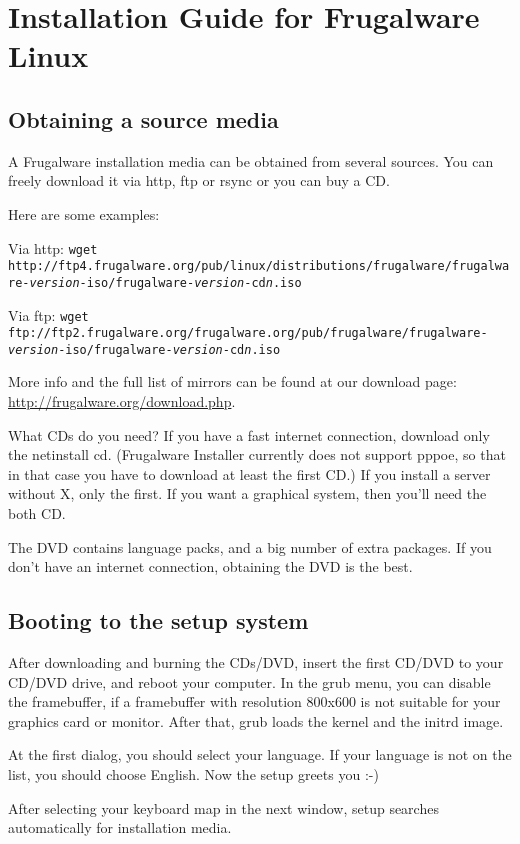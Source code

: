 \chapter{Installation Guide for Frugalware Linux}
\section{Obtaining a source media}

A Frugalware installation media can be obtained from
several sources. You can freely download it via http, ftp
or rsync or you can buy a CD.

Here are some examples:

Via http: {\tt wget http://ftp4.frugalware.org/pub/linux/distributions/frugalware/frugalware-\textit{version}-iso/frugalware-\textit{version}-cd\textit{n}.iso}

Via ftp: {\tt wget ftp://ftp2.frugalware.org/frugalware.org/pub/frugalware/frugalware-\textit{version}-iso/frugalware-\textit{version}-cd\textit{n}.iso}

More info and the full list of mirrors can be found at our
download page: \url{http://frugalware.org/download.php}.

What CDs do you need? If you have a fast internet
connection, download only the netinstall cd. (Frugalware
Installer currently does not support pppoe, so that in that
case you have to download at least the first CD.) If you
install a server without X, only the first. If you want a
graphical system, then you'll need the both CD.

The DVD contains language packs, and a big number of extra
packages. If you don't have an internet connection,
obtaining the DVD is the best.

\section{Booting to the setup system}

After downloading and burning the CDs/DVD, insert the first
CD/DVD to your CD/DVD drive, and reboot your computer. In
the grub menu, you can disable the framebuffer, if a
framebuffer with resolution 800x600 is not suitable for
your graphics card or monitor. After that, grub loads the
kernel and the initrd image.

At the first dialog, you should select your language. If 
your language is not on the list, you should choose 
English. Now the setup greets you :-)

After selecting your keyboard map in the next window, setup
searches automatically for installation media.

